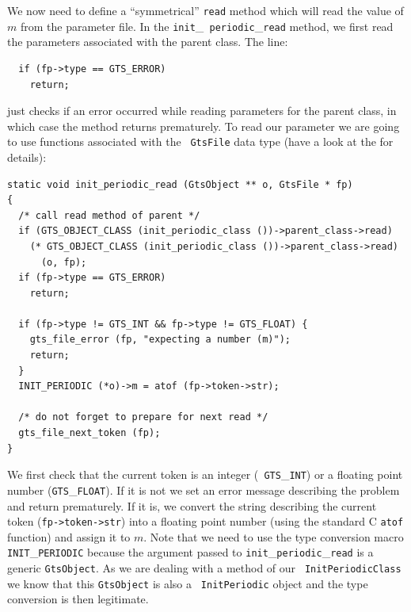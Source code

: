 \documentclass[a4paper]{article}
\begin{document}
We now need to define a ``symmetrical'' {\tt read} method which will
read the value of $m$ from the parameter file. In the {\tt init}\_{\tt
periodic}\_{\tt read} method, we first read the parameters associated
with the parent class. The line:
\begin{verbatim}
  if (fp->type == GTS_ERROR)
    return;
\end{verbatim}
just checks if an error occurred while reading parameters for the
parent class, in which case the method returns prematurely. To read
our parameter we are going to use functions associated with the {\tt
GtsFile} data type (have a look at the  for
details):
\begin{verbatim}
static void init_periodic_read (GtsObject ** o, GtsFile * fp)
{
  /* call read method of parent */
  if (GTS_OBJECT_CLASS (init_periodic_class ())->parent_class->read)
    (* GTS_OBJECT_CLASS (init_periodic_class ())->parent_class->read) 
      (o, fp);
  if (fp->type == GTS_ERROR)
    return;

  if (fp->type != GTS_INT && fp->type != GTS_FLOAT) {
    gts_file_error (fp, "expecting a number (m)");
    return;
  }
  INIT_PERIODIC (*o)->m = atof (fp->token->str);

  /* do not forget to prepare for next read */
  gts_file_next_token (fp);
}
\end{verbatim}
We first check that the current token is an integer ({\tt
GTS}\_{\tt INT}) or a floating point number ({\tt GTS}\_{\tt FLOAT}). If it is not
we set an error message describing the problem and return
prematurely. If it is, we convert the string describing the current
token ({\tt fp->token->str}) into a floating point number (using the
standard C {\tt atof} function) and assign it to $m$. Note that we
need to use the type conversion macro {\tt INIT}\_{\tt PERIODIC}
because the argument passed to {\tt init}\_{\tt periodic}\_{\tt read} is a generic
{\tt GtsObject}. As we are dealing with a method of our {\tt
InitPeriodicClass} we know that this {\tt GtsObject} is also a {\tt
InitPeriodic} object and the type conversion is then legitimate.
\end{document}
